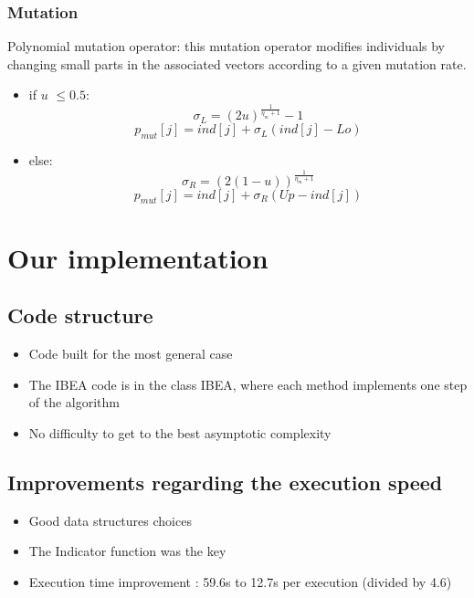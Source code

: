 \documentclass{beamer}
\begin{document}
\begin{frame}
\frametitle{Mutation}
Polynomial mutation operator:
this mutation operator modifies individuals by changing small parts in the associated vectors according to a given mutation rate.

\begin{itemize}
\item if $u$ $\leq 0.5$:
\begin{equation}
\sigma_L = (2u)^{\frac{1}{\eta_m +1}}-1 
\end{equation}
\begin{equation}
p_{mut}[j] = ind[j] + \sigma_L(ind[j]-Lo)
\end{equation}
\item else:
\begin{equation}
\sigma_R = (2(1-u))^{\frac{1}{\eta_m +1}} 
\end{equation}
\begin{equation}
p_{mut}[j] = ind[j] + \sigma_R(Up-ind[j])
\end{equation}
\end{itemize}

\end{frame}

\section{Our implementation}
\subsection{Code structure}
\begin{frame}
\begin{itemize}
\item Code built for the most general case
\item The IBEA code is in the class IBEA, where each method implements one step of the algorithm
\item No difficulty to get to the best asymptotic complexity
\end{itemize}
\end{frame}

\subsection{Improvements regarding the execution speed}
\begin{frame}
\begin{itemize}
\item Good data structures choices
\item The Indicator function was the key
\item Execution time improvement : 59.6s to 12.7s per execution (divided by 4.6)

\end{itemize}
\end{frame}
\end{document}
